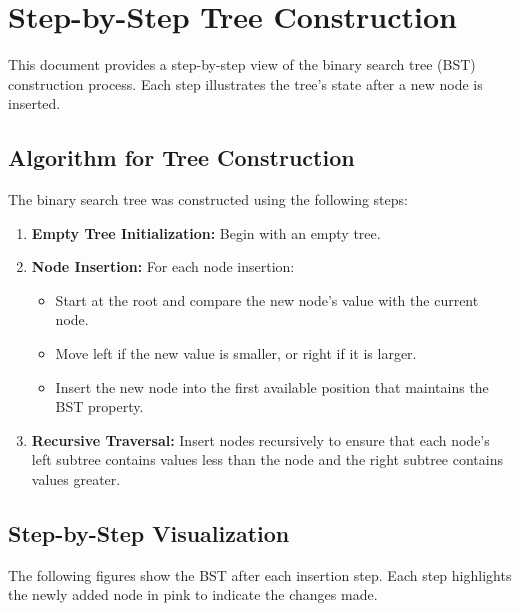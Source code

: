 \documentclass[10pt,a4paper]{article}
\begin{document}
\section*{Step-by-Step Tree Construction}
This document provides a step-by-step view of the binary search tree (BST) construction process. Each step illustrates the tree's state after a new node is inserted.

\subsection*{Algorithm for Tree Construction}
The binary search tree was constructed using the following steps:
\begin{enumerate}
    \item \textbf{Empty Tree Initialization:} Begin with an empty tree.
    \item \textbf{Node Insertion:} For each node insertion:
    \begin{itemize}
        \item Start at the root and compare the new node's value with the current node.
        \item Move left if the new value is smaller, or right if it is larger.
        \item Insert the new node into the first available position that maintains the BST property.
    \end{itemize}
    \item \textbf{Recursive Traversal:} Insert nodes recursively to ensure that each node's left subtree contains values less than the node and the right subtree contains values greater.
\end{enumerate}

\subsection*{Step-by-Step Visualization}
The following figures show the BST after each insertion step. Each step highlights the newly added node in pink to indicate the changes made.
\end{document}
